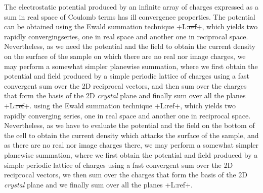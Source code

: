 \documentclass{article}
\newcommand{\notaL}[1]{{\color{blue}+L:#1+}}
\begin{document}
The electrostatic potential produced by an infinite array of
charges expressed as a sum in real space of Coulomb terms has ill
convergence properties. The potential can be obtained
using the Ewald summation technique \cite{T3,T4,T5}\notaL{\sout{ref}}, which yields
 two rapidly convergingseries, one in real space and another one in reciprocal space.
Nevertheless, as we need the potential and the field to obtain the
current density on the surface of the sample on which there are no
real nor image charges, we may perform a somewhat simpler planewise
summation, where we first obtain the potential and field produced by a
simple periodic lattice of charges using a fast convergent sum over the 2D
reciprocal vectors, and then sum over the charges that form the basis
of the 2D {\em crystal} plane and finally sum over all the
 planes \cite{T6,T7} \notaL{\sout{ref}}.
using the Ewald summation technique \notaL{ref}, which yields two rapidly converging
series, one in real space and another one in reciprocal space.
Nevertheless, as we have to evaluate the potential and the field on
the bottom of the cell to obtain the current density which attacks the
surface of the sample, and as there are no
real nor image charges there, we may perform a somewhat simpler planewise
summation, where we first obtain the potential and field produced by a
simple periodic lattice of charges using a fast convergent sum over the 2D
reciprocal vectors, we then sum over the charges that form the basis
of the 2D {\em crystal} plane and we finally sum over all the planes \notaL{ref}.
\end{document}
